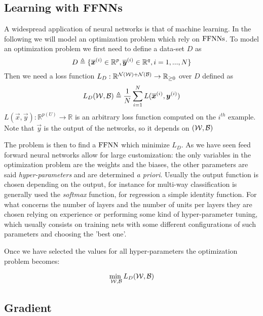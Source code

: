 \subsection{Learning with FFNNs}
A widespread application of neural networks is that of machine learning. In the following we will model an optimization problem which rely on $\mathrm{FFNNs}$.
To model an optimization problem we first need to define a data-set $D$ as 
\begin{equation}
D\triangleq\{\overline{\boldsymbol{x}}^{(i)} \in \mathbb{R}^p, \overline{\boldsymbol{y}}^{(i)} \in \mathbb{R}^q,  i=1,...,N\}
\end{equation}
Then we need a loss function $L_D:\mathbb{R}^{\mathcal{N}(\mathcal{W})+\mathcal{N}(\mathcal{B})} \rightarrow \mathbb{R}_{\geq 0}$ over $D$ defined as
\begin{equation}
L_D(\mathcal{W},\mathcal{B})\triangleq\frac{1}{N}\sum_{i=1}^N L(\overline{\boldsymbol{x}}^{(i)},\boldsymbol{y}^{(i)}) 
\end{equation}
$L(\vec{x},\vec{y}):\mathbb{R}^{p(U)} \rightarrow \mathbb{R}$ is an arbitrary loss function computed on the $i^{th}$ example. Note that $\vec{y}$ is the output of the
networks, so it depends on $(\mathcal{W},\mathcal{B})$


The problem is then to find a $\mathrm{FFNN}$ which minimize $L_D$. As we have seen feed forward neural networks allow for large customization: the only variables in the optimization problem are the weights
and the biases, the other
parameters are said \textit{hyper-parameters} and are determined \textit{a priori}. Usually the output function is chosen depending on the output, for instance for multi-way classification
is generally used the \textit{softmax} function, for regression a simple identity function.
For what concerns the number of layers and the number of units per layers they are chosen relying on experience or performing some kind of hyper-parameter tuning, which usually consists on training nets
with some different configurations of such parameters and choosing the 'best one'.

Once we have selected the values for all hyper-parameters the optimization problem becomes:

\begin{equation}
\underset{\mathcal{W},\mathcal{B}}{\text{min  }} L_D(\mathcal{W},\mathcal{B}) \\
\end{equation}


\subsection{Gradient}


